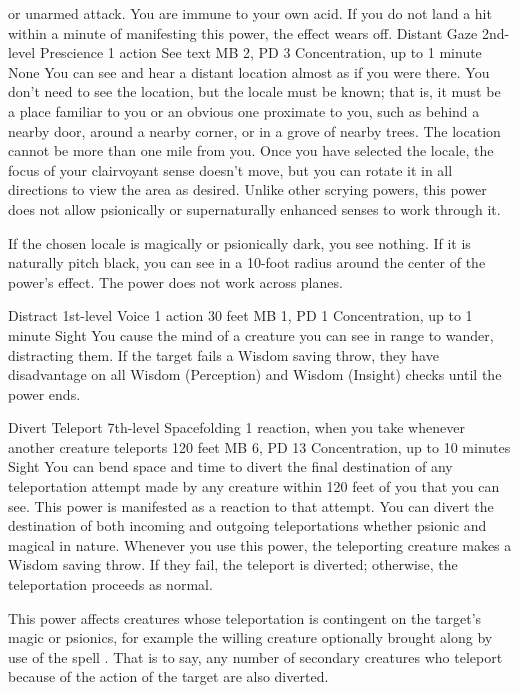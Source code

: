 or unarmed attack. You are immune to your own acid. If you
do not land a hit within a minute of manifesting this power,
the effect wears off.
\DndPowerHeader%
    {Distant Gaze\label{pwr:distant-gaze}}
    {2nd-level Prescience}
    {1 action}
    {See text}
    {MB 2, PD 3}
    {Concentration, up to 1 minute}
    {None}
You can see and hear a distant location almost
as if you were there. You don't need to see the location,
but the locale must be known; that is, it must be a place
familiar to you or an obvious one proximate to you, such as
behind a nearby door, around a nearby corner, or in a grove
of nearby trees.
The location cannot be more than one mile from you.
Once you have selected the locale, the focus
of your clairvoyant sense doesn't move, but you can rotate
it in all directions to view the area as desired. Unlike other
scrying powers, this power does not allow psionically
or supernaturally enhanced senses to work through it.

If the chosen locale is magically or psionically dark, you
see nothing. If it is naturally pitch black, you can see in
a 10-foot radius around the center of the power's effect.
The power does not work across planes.

\DndPowerHeader%
    {Distract\label{pwr:distract}}
    {1st-level Voice}
    {1 action}
    {30 feet}
    {MB 1, PD 1}
    {Concentration, up to 1 minute}
    {Sight}
You cause the mind of a creature
you can see in range to wander, distracting them. If the target
fails a Wisdom saving throw, they have disadvantage on all
Wisdom (Perception) and Wisdom (Insight) checks until the
power ends.

\DndPowerHeader%
    {Divert Teleport\label{pwr:divert-teleport}}
    {7th-level Spacefolding}
    {1 reaction, when you take whenever another creature teleports}
    {120 feet}
    {MB 6, PD 13}
    {Concentration, up to 10 minutes}
    {Sight}
You can bend space and time to divert the
final destination of any teleportation attempt made by any
creature within 120 feet of you that you can see.
This power is manifested as a reaction to that attempt.
You can divert the destination of both incoming and outgoing
teleportations whether psionic and magical in nature. Whenever you use this
power, the teleporting creature makes a Wisdom saving throw.
If they fail, the teleport is diverted; otherwise, the teleportation
proceeds as normal.

This power affects creatures whose teleportation is contingent
on the target's magic or psionics, for example the willing creature
optionally brought along by use of the spell .
That is to say, any number of secondary creatures
who teleport because of the action of the target are also diverted.  

